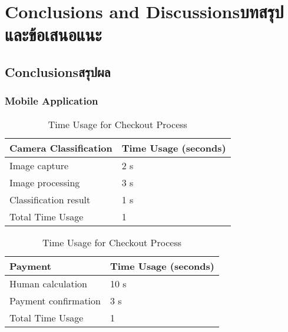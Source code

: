 \chapter{\ifenglish Conclusions and Discussions\else บทสรุปและข้อเสนอแนะ\fi}

\section{\ifenglish Conclusions\else สรุปผล\fi}

\subsection{Mobile Application }
 
\begin{table}[htbp]
    \centering
    \caption{Time Usage for Checkout Process}
    \begin{tabular}{|p{5cm}|p{2cm}|}
        \hline
        \textbf{Camera Classification} & \textbf{Time Usage (seconds)} \\
        \hline
        Image capture                  & 2 s                           \\
        Image processing               & 3 s                           \\
        Classification result          & 1 s                           \\
        \hline
        Total Time Usage               & 1                             \\
        \hline
    \end{tabular}
\end{table}

\begin{table}[htbp]
    \centering
    \caption{Time Usage for Checkout Process}
    \begin{tabular}{|p{5cm}|p{2cm}|}
        \hline
        \textbf{Payment}     & \textbf{Time Usage (seconds)} \\
        \hline
        Human calculation    & 10 s                          \\
        Payment confirmation & 3 s                           \\
        \hline
        Total Time Usage     & 1                             \\
        \hline
    \end{tabular}
\end{table}


